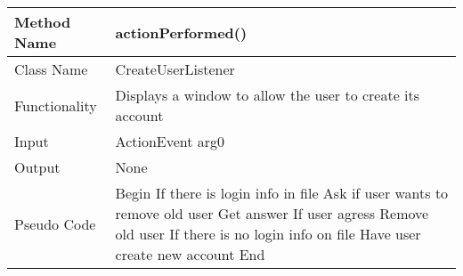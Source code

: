 \documentclass{article}
\newcommand\tab[1][1cm]{\hspace*{#1}}
\begin{document}
\begin{center}
\begin{tabular}{|p{2.5cm}||p{10cm}|}
\hline
Method Name & actionPerformed() \\
\hline
Class Name & CreateUserListener \\
\hline
Functionality & Displays a window to allow the user to create its account\\
\hline
Input & ActionEvent arg0\\
\hline
Output & None\\
\hline
Pseudo Code & Begin\newline
\tab If there is login info in file\newline
\tab\tab Ask if user wants to remove old user \newline
\tab \tab Get answer \newline
\tab \tab If user agress\newline
\tab \tab \tab Remove old user\newline
\tab If there is no login info on file \newline
\tab \tab Have user create new account\newline
\tab \newline
\tab \newline
End \\
\hline
\end{tabular}
\end{center}
\end{document}
